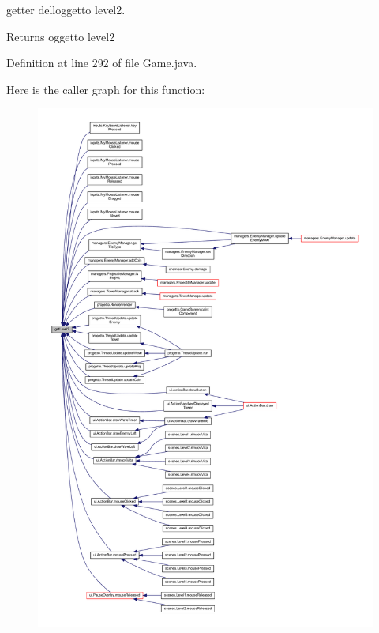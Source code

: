 getter dell\textquotesingle{}oggetto level2. 

\begin{DoxyReturn}{Returns}
oggetto level2 
\end{DoxyReturn}


Definition at line 292 of file Game.\+java.

Here is the caller graph for this function\+:
\nopagebreak
\begin{figure}[H]
\begin{center}
\leavevmode
\includegraphics[width=350pt]{classprogetto_1_1_game_a26827f97d382e852c53c15990619c8b7_icgraph}
\end{center}
\end{figure}
\mbox{\label{classprogetto_1_1_game_a0869f04fd1631b5ad909e51c85e9e57b}} 
